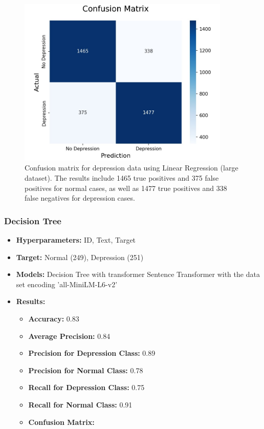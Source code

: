 \documentclass[runningheads,a4paper,11pt]{report}
\begin{document}
\begin{figure}[h]
\centering
\includegraphics[width=0.9\textwidth]{Depression-Data-LinearRegression.jpg}
\caption[Confusion matrix for depression data (linear regression)]{\centering Confusion matrix for depression data using Linear Regression (large dataset). The results include 1465 true positives and 375 false positives for normal cases, as well as 1477 true positives and 338 false negatives for depression cases.}
\end{figure}

\vspace{0.5cm} %

\subsubsection{Decision Tree}
\label{section:tree}

\begin{itemize}
    \item \textbf{Hyperparameters:} ID, Text, Target
    \item \textbf{Target:} Normal (249), Depression (251)
    \item \textbf{Models:} Decision Tree with transformer Sentence Transformer with the data set encoding 'all-MiniLM-L6-v2'
    \item \textbf{Results:}
    \begin{itemize}
        \item \textbf{Accuracy:} 0.83
        \item \textbf{Average Precision:} 0.84
        \item \textbf{Precision for Depression Class:} 0.89
        \item \textbf{Precision for Normal Class:} 0.78
        \item \textbf{Recall for Depression Class:} 0.75
        \item \textbf{Recall for Normal Class:} 0.91
        \item \textbf{Confusion Matrix:}
    \end{itemize}
\end{itemize}
\end{document}
